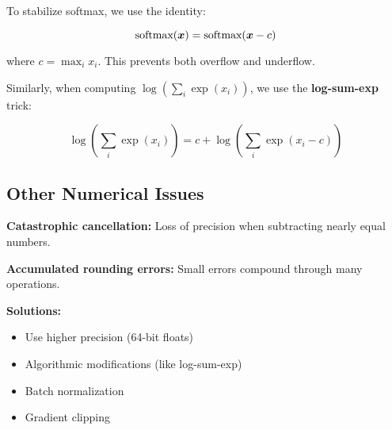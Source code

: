 To stabilize softmax, we use the identity:

\begin{equation}
\text{softmax}(\boldsymbol{x}) = \text{softmax}(\boldsymbol{x} - c)
\end{equation}

where $c = \max_i x_i$. This prevents both overflow and underflow.

Similarly, when computing $\log(\sum_i \exp(x_i))$, we use the \textbf{log-sum-exp} trick:

\begin{equation}
\log\left(\sum_i \exp(x_i)\right) = c + \log\left(\sum_i \exp(x_i - c)\right)
\end{equation}

\subsection{Other Numerical Issues}

\textbf{Catastrophic cancellation:} Loss of precision when subtracting nearly equal numbers.

\textbf{Accumulated rounding errors:} Small errors compound through many operations.

\textbf{Solutions:}
\begin{itemize}
    \item Use higher precision (64-bit floats)
    \item Algorithmic modifications (like log-sum-exp)
    \item Batch normalization
    \item Gradient clipping
\end{itemize}
